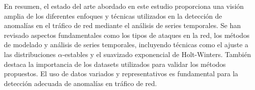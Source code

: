 En resumen, el estado del arte abordado en este estudio proporciona una visión amplia de los diferentes enfoques y técnicas utilizados en la detección de anomalías en el tráfico de red mediante el análisis de series temporales. Se han revisado aspectos fundamentales como los tipos de ataques en la red, los métodos de modelado y análisis de series temporales, incluyendo técnicas como el ajuste a las distribuciones $\alpha$-estables y el suavizado exponencial de Holt-Winters. También destaca la importancia de los datasets utilizados para validar los métodos propuestos.
El uso de datos variados y representativos es fundamental para la detección adecuada de anomalías en tráfico de red.